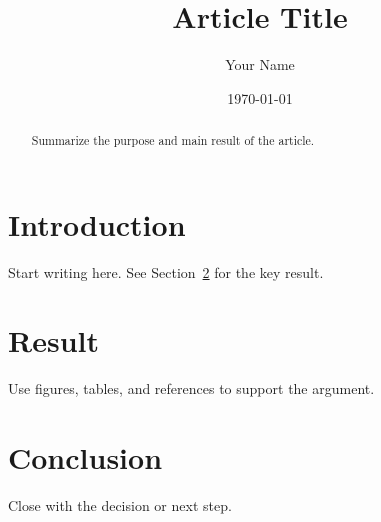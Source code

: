\documentclass[11pt]{article}
\title{Article Title}
\author{Your Name}
\date{\today}
\begin{document}
\maketitle

\begin{abstract}
Summarize the purpose and main result of the article.
\end{abstract}

\section{Introduction}
Start writing here. See Section~\ref{sec:result} for the key result.

\section{Result}\label{sec:result}
Use figures, tables, and references to support the argument.

\section{Conclusion}
Close with the decision or next step.
\end{document}
